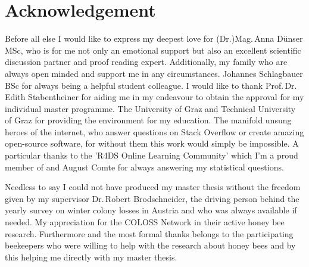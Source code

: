 \chapter*{Acknowledgement}
\label{sec:acknowledgement}
\vspace*{-10mm}

Before all else I would like to express my deepest love for (Dr.)Mag.\,Anna Dünser\,MSc, who is for me not only an emotional support but also an excellent scientific discussion partner and proof reading expert. Additionally, my family who are always open minded and support me in any circumstances. Johannes Schlagbauer\,BSc for always being a helpful student colleague. I would like to thank Prof.\,Dr.\,Edith Stabentheiner for aiding me in my endeavour to obtain the approval for my individual master programme. The University of Graz and Technical University of Graz for providing the environment for my education. The manifold unsung heroes of the internet, who answer questions on Stack Overflow or create amazing open-source software, for without them this work would simply be impossible. A particular thanks to the 'R4DS Online Learning Community' which I'm a proud member of and August Comte for always answering my statistical questions.

Needless to say I could not have produced my master thesis without the freedom given by my supervisor Dr.\,Robert Brodschneider, the driving person behind the yearly survey on winter colony losses in Austria and who was always available if needed. My appreciation for the COLOSS Network in their active honey bee research. Furthermore and the most formal thanks belongs to the participating beekeepers who were willing to help with the research about honey bees and by this helping me directly with my master thesis.